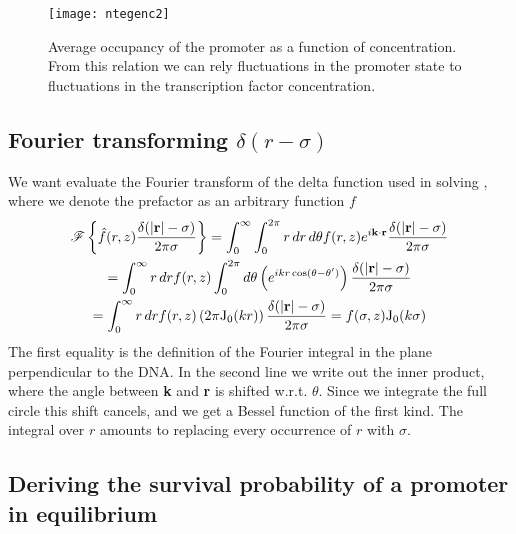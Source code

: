 \begin{figure}[ht]
\centering
\texttt{[image: ntegenc2]}
\caption{ Average occupancy of the promoter as a function of concentration. From this relation we can rely fluctuations in the promoter state to fluctuations in the transcription factor concentration.}
\end{figure}



\subsection{ Fourier transforming $\delta(r-\sigma)$}
We want evaluate the Fourier transform of the delta function used in solving , where we denote the prefactor as an arbitrary function $f$
\begin{multline}
 \mathscr{F}\left\lbrace \hat{f}(r,z) \frac{\delta(|\mathbf r \mathrm| - \sigma)}{2 \pi \sigma} \right\rbrace 
 = \int_0^{\infty} \int_0^{2 \pi} r\,dr \, d\theta f(r,z) e^{i {\bf k \cdot r}} \frac{\delta(|\mathbf r \mathrm| - \sigma)}{2 \pi \sigma} \\
 = \int_0^{\infty} r\,dr f(r,z) \int_0^{2 \pi} d\theta \left( e^{i k r \, {\rm cos}(\theta - \theta')} \right) \frac{\delta(|\mathbf r \mathrm| - \sigma)}{2 \pi \sigma} \\
 = \int_0^{\infty} r\,dr f(r,z) \left( 2 \pi {\rm J_0}(k r) \right) \frac{\delta(|\mathbf r \mathrm| - \sigma)}{2 \pi \sigma} 
 = f(\sigma, z) {\rm J_0}(k \sigma)
\end{multline}
The first equality is the definition of the Fourier integral in the plane perpendicular to the DNA. In the second line we write out the inner product, where the angle between {\bf k} and {\bf r} is shifted w.r.t. $\theta$. Since we integrate the full circle this shift cancels, and we get a Bessel function of the first kind. The integral over $r$ amounts to replacing every occurrence of $r$ with $\sigma$.




\newpage
\subsection{ Deriving the survival probability of a promoter in equilibrium}

